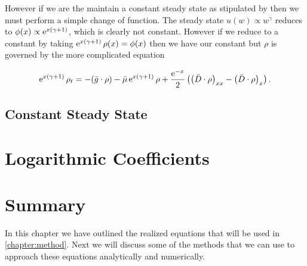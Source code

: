 \documentclass[../main]{subfiles}
\begin{document}
  However if we are the maintain a constant steady state as stipulated by \cite{sheldon1967} then we must perform a simple change of function. The steady state $u(w) \propto w^{\gamma}$ reduces to $\phi(x) \propto \operatorname{e}^{x(\gamma +1)}$, which is clearly not constant. However if we reduce to a constant by taking $\operatorname{e}^{x(\gamma + 1)} \rho(x) = \phi(x)$ then we have our constant but $\rho$ is governed by the more complicated equation

  \begin{equation}
    \operatorname{e}^{x(\gamma + 1)} \rho_t = - (\bar{g} \cdot \rho) - \bar{\mu} \operatorname{e}^{x(\gamma + 1)} \rho + \frac{\operatorname{e}^{-x}}{2} \left( \left( \bar{D} \cdot \rho \right)_{xx} - \left( \bar{D} \cdot \rho \right)_x \right).
  \end{equation}

  \subsection{Constant Steady State}

  \section{Logarithmic Coefficients}

  \section{Summary}
  In this chapter we have outlined the realized equations that will be used in \autoref{chapter:method}. Next we will discuss some of the methods that we can use to approach these equations analytically and numerically.
\end{document}
